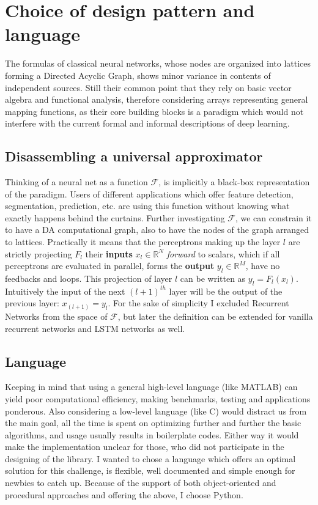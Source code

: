 \section{Choice of design pattern and language}

The formulas of classical neural networks, whose nodes are organized into
 lattices forming a Directed Acyclic Graph, shows minor variance in
 contents of independent sources. Still their common point that they rely
 on basic vector algebra and functional analysis, therefore considering
 arrays representing general mapping functions, as their core building
 blocks is a paradigm which would not interfere with the current formal
 and informal descriptions of deep learning.

\subsection{Disassembling a universal approximator}
Thinking of a neural net as a function \(\mathcal{F}\), is implicitly a black-box representation of the paradigm.
Users of different applications which offer feature detection, segmentation, prediction, etc. are using this function without knowing what exactly happens behind the curtains. 
Further investigating $\mathcal{F}$, we can constrain it to have a DA computational graph, also to have the nodes of the graph arranged to lattices.
Practically it means that the perceptrons making up the layer \(l\) are strictly projecting $F_l$ their \textbf{inputs} 
$ x_l \in \mathbb{R}^N $ \emph{forward} to scalars, which if all perceptrons are evaluated in parallel, forms the 
\textbf{output} $y_l \in \mathbb{R}^M$, have no feedbacks and loops. 
This projection of layer $l$ can be written as $y_l = F_l(x_l)$. 
Intuitively the input of the next $(l+1)^{th}$ layer will be the output of the previous layer:
$x_{(l+1)} = y_l$.
For the sake of simplicity I excluded Recurrent Networks from the space of $\mathcal{F}$, but later the definition can be extended for vanilla recurrent networks and LSTM networks as well.

\subsection{Language} Keeping in mind that using a general high-level language (like MATLAB) can yield poor computational efficiency, making benchmarks, testing and applications ponderous.
Also considering a low-level language (like C) 
would distract us from the main goal, all 
the time is spent on optimizing further and 
further the basic algorithms, and usage usually 
results in boilerplate codes. 
Either way it would make the implementation unclear for those, who did not participate in the designing of the library.
I wanted to chose a language which offers an optimal solution for this challenge, is flexible, well documented and simple enough for newbies to catch up.
Because of the support of both object-oriented and procedural approaches and offering the above, I choose Python.

